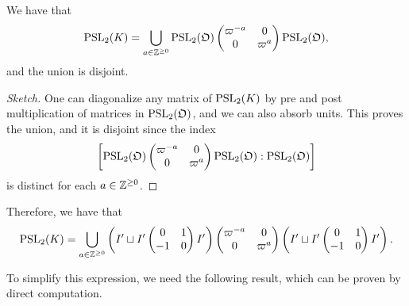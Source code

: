 \begin{proposition}
    We have that
    $$\mathrm{PSL}_2(K)=\bigcup_{a\in\mathbb{Z}^{\geq 0}}\mathrm{PSL}_2(\mathfrak{O})\begin{pmatrix}
        \varpi^{-a} & 0\\
        0 & \varpi^a \\
    \end{pmatrix}\mathrm{PSL}_2(\mathfrak{O}),$$
    and the union is disjoint.
\end{proposition}
\begin{proof}[Sketch]
    One can diagonalize any matrix of $\mathrm{PSL}_2(K)$ by pre and post multiplication of matrices in $\mathrm{PSL}_2(\mathfrak{O})$, and we can also absorb units. This proves the union, and it is disjoint since the index 
    $$\left[\mathrm{PSL}_2(\mathfrak{O})\begin{pmatrix}
        \varpi^{-a} & 0\\
        0 & \varpi^a \\
    \end{pmatrix}\mathrm{PSL}_2(\mathfrak{O}):\mathrm{PSL}_2(\mathfrak{O})\right]$$
    is distinct for each $a\in\mathbb{Z}^{\geq 0}$.
\end{proof}

Therefore, we have that
$$\mathrm{PSL}_2(K)=\bigcup_{a\in\mathbb{Z}^{\geq0}}\left(I'\sqcup I'\begin{pmatrix}
    0 & 1\\
    -1 & 0\\
\end{pmatrix}I'\right)\begin{pmatrix}
    \varpi^{-a} & 0\\
    0 & \varpi^a \\
\end{pmatrix}\left(I'\sqcup I'\begin{pmatrix}
    0 & 1\\
    -1 & 0\\
\end{pmatrix}I'\right).$$

To simplify this expression, we need the following result, which can be proven by direct computation.


